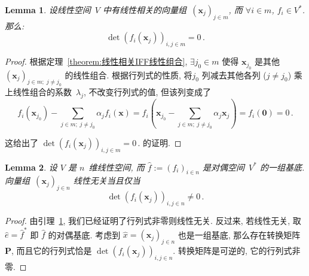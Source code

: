 \documentclass[openany]{ctexbook}
\theoremstyle{plain}
\newtheorem{lemma}{Lemma} %
\theoremstyle{definition}
\newcommand*{\bv}{\boldsymbol} %
\begin{document}
\begin{lemma}\label{lemma:线性相关则行列式为0}
	设线性空间~$V$ 中有线性相关的向量组~$(\bv x_j)_{j\in m}$, 而 $\forall i \in m$, $f_i \in V^*$. 那么:
	\begin{equation*}
		\det\left( 
			f_i (\bv x_j)
		 \right)_{i,j \in m} = 0\,.
	\end{equation*}
\end{lemma}
\begin{proof}
	根据定理~\ref{theorem:线性相关IFF线性组合}, $\exists j_0 \in m$ 使得 $\bv x_{j_0}$ 是其他 $(\bv x_j)_{j\in m;\; j \neq j_0}$ 的线性组合. 
	根据行列式的性质, 将$j_0$ 列减去其他各列 ($j \neq j_0$) 乘上线性组合的系数~$\lambda_j$, 不改变行列式的值, 但该列变成了
	\begin{equation*}
		f_i(\bv x_{j_0}) 
			- \sum_{j \in m;\; j \neq j_0} \alpha_j f_i(\bv x)
			= f_i\left(\bv x_{j_0} 
					- \sum_{j \in m;\; j \neq j_0} \alpha_j \bv x_j
				\right)
			= f_i(\bv 0)
			= 0\,.
	\end{equation*}
	
	这给出了 $
		\det\left( 
			f_i (\bv x_j)
		 \right)_{i,j \in m} = 0\,.
	$ 的证明.
\end{proof}

\begin{lemma}\label{lemma:线性无关IFF行列式非零}
	设 $V$ 是 $n$~维线性空间, 而 $\hat f := (f_i)_{i \in n}$ 是对偶空间~$V^*$ 的一组基底.
	向量组~$(\bv x_j)_{j \in n}$ 线性无关当且仅当
	\begin{equation*}
		\det(f_i(\bv x_j))_{i,j \in n} \neq 0\,.
	\end{equation*}
\end{lemma}
\begin{proof}
	由引理~\ref{lemma:线性相关则行列式为0}, 我们已经证明了行列式非零则线性无关. 
	反过来, 若线性无关, 取 $\hat e = \hat f^*$ 即 $\hat f$ 的对偶基底. 
	考虑到 $\hat x = (\bv x_j)_{j \in n}$ 也是一组基底, 那么存在转换矩阵 $\bv P$, 而且它的行列式恰是 $\det(f_i(\bv x_j))_{i,j \in n}$. 
	转换矩阵是可逆的, 它的行列式非零.
\end{proof}
\end{document}
